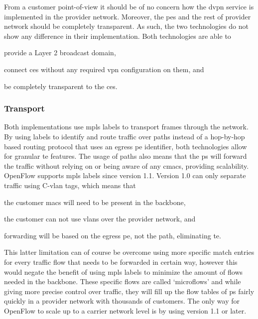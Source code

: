 From a customer point-of-view it should be of no concern how the \ac{dvpn} service is implemented in the provider network. Moreover, the \acp{pe} and the rest of provider network should be completely transparent. As such, the two technologies do not show any difference in their implementation. Both technologies are able to 
\begin{inparaenum}[\itshape 1\upshape)]
	\item provide a Layer 2 broadcast domain,
	\item connect \acp{ce} without any required \ac{vpn} configuration on them, and
	\item be completely transparent to the \acp{ce}.
\end{inparaenum}


\subsubsection{Transport} %
\label{ssub:transport}

Both implementations use \ac{mpls} labels to transport frames through the network. By using labels to identify and route traffic over paths instead of a hop-by-hop based routing protocol that uses an egress \ac{pe} identifier, both technologies allow for granular \ac{te} features.   The usage of paths also means that the \acp{p} will forward the traffic without relying on or being aware of any \acp{cmac}, providing scalability. OpenFlow supports \ac{mpls} labels since version 1.1. Version 1.0 can only separate traffic using C-\ac{vlan} tags, which means that 
\begin{inparaenum}
	\item the customer \acp{mac} will need to be present in the backbone, 
	\item the customer can not use \acp{vlan} over the provider network, and
	\item forwarding will be based on the egress \ac{pe}, not the path, eliminating \ac{te}.
\end{inparaenum}
This latter limitation can of course be overcome using more specific match entries for every traffic flow that needs to be forwarded in certain way, however this would negate the benefit of using \ac{mpls} labels to minimize the amount of flows needed in the backbone. These specific flows are called `microflows' and while giving more precise control over traffic, they will fill up the flow tables of \acp{p} fairly quickly in a provider network with thousands of customers. The only way for OpenFlow to scale up to a carrier network level is by using version 1.1 or later.

